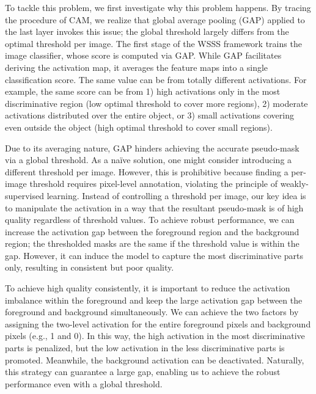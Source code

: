 \documentclass[10pt,twocolumn,letterpaper]{article}
\begin{document}
To tackle this problem, we first investigate why this problem happens. By tracing the procedure of CAM, we realize that global average pooling (GAP) applied to the last layer invokes this issue; the global threshold largely differs from the optimal threshold per image. The first stage of the WSSS framework trains the image classifier, whose score is computed via GAP. While GAP facilitates deriving the activation map, it averages the feature maps into a single classification score. The same value can be from totally different activations. For example, the same score can be from 1) high activations only in the most discriminative region (low optimal threshold to cover more regions), 2) moderate activations distributed over the entire object, or 3) small activations covering even outside the object (high optimal threshold to cover small regions).

Due to its averaging nature, GAP hinders achieving the accurate pseudo-mask via a global threshold. As a na\"ive solution, one might consider introducing a different threshold per image. However, this is prohibitive because finding a per-image threshold requires pixel-level annotation, violating the principle of weakly-supervised learning. Instead of controlling a threshold per image, our key idea is to manipulate the activation in a way that the resultant pseudo-mask is of high quality regardless of threshold values. To achieve robust performance, we can increase the activation gap between the foreground region and the background region; the thresholded masks are the same if the threshold value is within the gap. However, it can induce the model to capture the most discriminative parts only, resulting in consistent but poor quality. 

To achieve high quality consistently, it is important to reduce the activation imbalance within the foreground and keep the large activation gap between the foreground and background simultaneously. We can achieve the two factors by assigning the two-level activation for the entire foreground pixels and background pixels (e.g., 1 and 0). In this way, the high activation in the most discriminative parts is penalized, but the low activation in the less discriminative parts is promoted. Meanwhile, the background activation can be deactivated. Naturally, this strategy can guarantee a large gap, enabling us to achieve the robust performance even with a global threshold.
\end{document}

